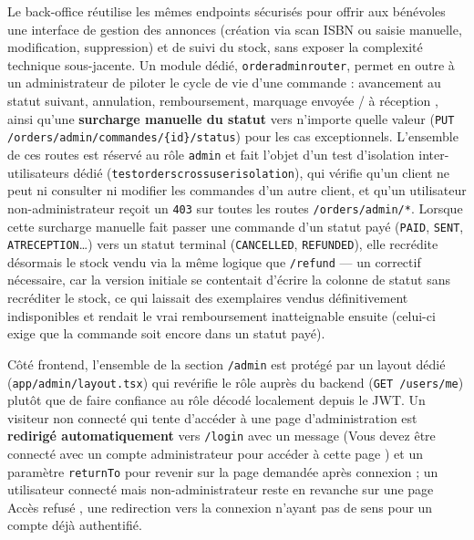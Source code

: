 \documentclass[12pt, a4paper]{report}
\renewcommand{\_}{\origunderscore\allowbreak}
\begin{document}
Le back-office réutilise les mêmes endpoints sécurisés pour offrir aux bénévoles une interface de gestion des annonces (création via scan ISBN ou saisie manuelle, modification, suppression) et de suivi du stock, sans exposer la complexité technique sous-jacente. Un module dédié, \texttt{order\_admin\_router}, permet en outre à un administrateur de piloter le cycle de vie d'une commande : avancement au statut suivant, annulation, remboursement, marquage \og envoyée \fg{} / \og à réception \fg{}, ainsi qu'une \textbf{surcharge manuelle du statut} vers n'importe quelle valeur (\texttt{PUT /orders/admin/commandes/\{id\}/status}) pour les cas exceptionnels. L'ensemble de ces routes est réservé au rôle \texttt{admin} et fait l'objet d'un test d'isolation inter-utilisateurs dédié (\texttt{test\_orders\_cross\_user\_isolation}), qui vérifie qu'un client ne peut ni consulter ni modifier les commandes d'un autre client, et qu'un utilisateur non-administrateur reçoit un \texttt{403} sur toutes les routes \texttt{/orders/admin/*}. Lorsque cette surcharge manuelle fait passer une commande d'un statut payé (\texttt{PAID}, \texttt{SENT}, \texttt{AT\_RECEPTION}\dots) vers un statut terminal (\texttt{CANCELLED}, \texttt{REFUNDED}), elle recrédite désormais le stock vendu via la même logique que \texttt{/refund} — un correctif nécessaire, car la version initiale se contentait d'écrire la colonne de statut sans recréditer le stock, ce qui laissait des exemplaires vendus définitivement indisponibles et rendait le vrai remboursement inatteignable ensuite (celui-ci exige que la commande soit encore dans un statut payé).

Côté frontend, l'ensemble de la section \texttt{/admin} est protégé par un layout dédié (\texttt{app/\allowbreak admin/\allowbreak layout.tsx}) qui revérifie le rôle auprès du backend (\texttt{GET /users/me}) plutôt que de faire confiance au rôle décodé localement depuis le JWT. Un visiteur non connecté qui tente d'accéder à une page d'administration est \textbf{redirigé automatiquement} vers \texttt{/login} avec un message (\og Vous devez être connecté avec un compte administrateur pour accéder à cette page \fg{}) et un paramètre \texttt{returnTo} pour revenir sur la page demandée après connexion ; un utilisateur connecté mais non-administrateur reste en revanche sur une page \og Accès refusé \fg{}, une redirection vers la connexion n'ayant pas de sens pour un compte déjà authentifié.
\end{document}
